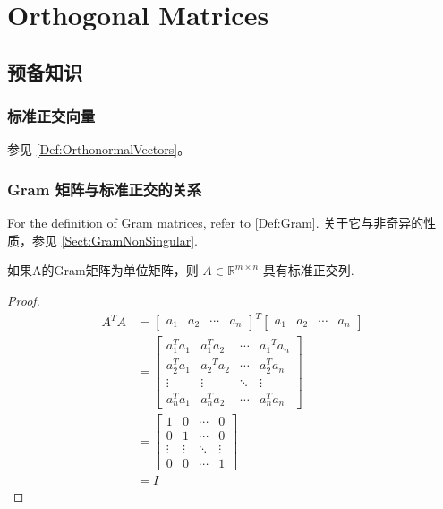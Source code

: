\chapter{Orthogonal Matrices}

\section{预备知识}

\subsection{标准正交向量}

参见 \ref{Def:OrthonormalVectors}。

\subsection{Gram 矩阵与标准正交的关系}

For the definition of Gram matrices, refer to \ref{Def:Gram}. 关于它与非奇异的性质，参见 \ref{Sect:GramNonSingular}.

\begin{theorem}
    如果A的Gram矩阵为单位矩阵，则 $ A \in \mathbb{R}^{m \times n} $ 具有标准正交列.
\end{theorem}

\begin{proof}
    $$ \begin{aligned} A^{T} A&=\left[\begin{array}{llll}a_{1} & a_{2} & \cdots & a_{n}\end{array}\right]^{T}\left[\begin{array}{llll}a_{1} & a_{2} & \cdots & a_{n}\end{array}\right] 
    \\ &=\left[\begin{array}{cccc}a_{1}^{T} a_{1} & a_{1}^{T} a_{2} & \cdots & a_{1}{ }^{T} a_{n} \\ a_{2}^{T} a_{1} & a_{2}{ }^{T} a_{2} & \cdots & a_{2}^{T} a_{n} \\ \vdots & \vdots & \ddots & \vdots \\ a_{n}^{T} a_{1} & a_{n}^{T} a_{2} & \cdots & a_{n}^{T} a_{n}\end{array}\right] 
    \\  &=\left[\begin{array}{cccc}1 & 0 & \cdots & 0 \\ 0 & 1 & \cdots & 0 \\ \vdots & \vdots & \ddots & \vdots \\ 0 & 0 & \cdots & 1\end{array}\right] 
    \\ & =I  \end{aligned} $$
\end{proof}

